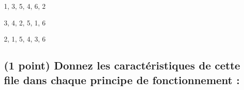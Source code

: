 \documentclass[11pt,a4paper]{article}
\begin{document}


\begin{center}
\begin{table}[ht!]
  \centering
  \begin{minipage}{0.33\textwidth}

\begin{center}
\begin{large}
1, 3, 5, 4, 6, 2
\end{large}

\medskip

\end{center}

  \end{minipage}
  \hfillx
  \begin{minipage}{0.33\textwidth}

\begin{center}
\begin{large}
3, 4, 2, 5, 1, 6
\end{large}

\medskip

\end{center}

  \end{minipage}
  \hfillx
  \begin{minipage}{0.33\textwidth}

\begin{center}
\begin{large}
2, 1, 5, 4, 3, 6
\end{large}

\medskip

\end{center}

  \end{minipage}
\end{table}
\end{center}

\vfillLast

\clearpage


\subsection{(1 point) Donnez les caractéristiques de cette file dans chaque principe de fonctionnement : }
\end{document}
